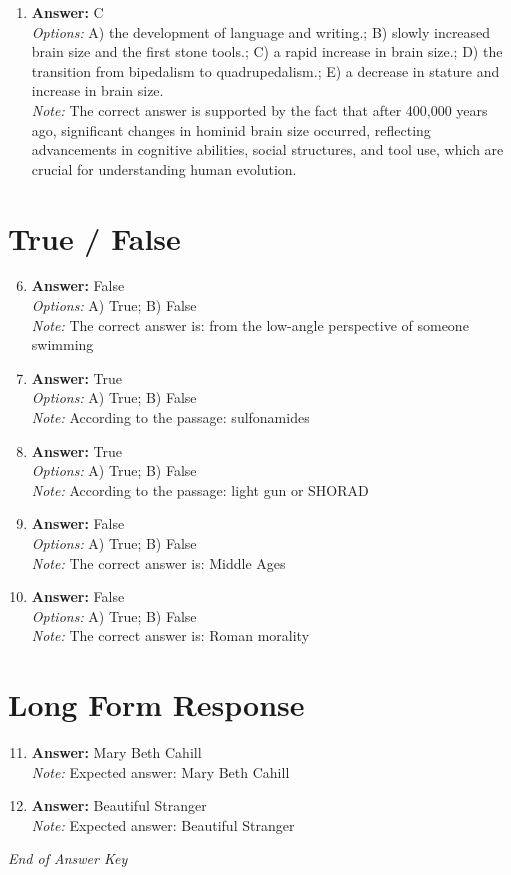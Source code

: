 \documentclass[12pt]{article}
\begin{document}
\begin{enumerate}[label=\arabic*.]
\item \textbf{Answer:} C
\\ \textit{Options:} A) the development of language and writing.; B) slowly increased brain size and the first stone tools.; C) a rapid increase in brain size.; D) the transition from bipedalism to quadrupedalism.; E) a decrease in stature and increase in brain size.
\\ \textit{Note:} The correct answer is supported by the fact that after 400,000 years ago, significant changes in hominid brain size occurred, reflecting advancements in cognitive abilities, social structures, and tool use, which are crucial for understanding human evolution.
\end{enumerate}

\section*{True / False}
\begin{enumerate}[label=\arabic*.]
\setcounter{enumi}{5}
\item \textbf{Answer:} False
\\ \textit{Options:} A) True; B) False
\\ \textit{Note:} The correct answer is: from the low-angle perspective of someone swimming
\item \textbf{Answer:} True
\\ \textit{Options:} A) True; B) False
\\ \textit{Note:} According to the passage: sulfonamides
\item \textbf{Answer:} True
\\ \textit{Options:} A) True; B) False
\\ \textit{Note:} According to the passage: light gun or SHORAD
\item \textbf{Answer:} False
\\ \textit{Options:} A) True; B) False
\\ \textit{Note:} The correct answer is: Middle Ages
\item \textbf{Answer:} False
\\ \textit{Options:} A) True; B) False
\\ \textit{Note:} The correct answer is: Roman morality
\end{enumerate}

\section*{Long Form Response}
\begin{enumerate}[label=\arabic*.]
\setcounter{enumi}{10}
\item \textbf{Answer:} Mary Beth Cahill
\\ \textit{Note:} Expected answer: Mary Beth Cahill
\item \textbf{Answer:} Beautiful Stranger
\\ \textit{Note:} Expected answer: Beautiful Stranger
\end{enumerate}

\vfill
\noindent\textit{End of Answer Key}
\end{document}
